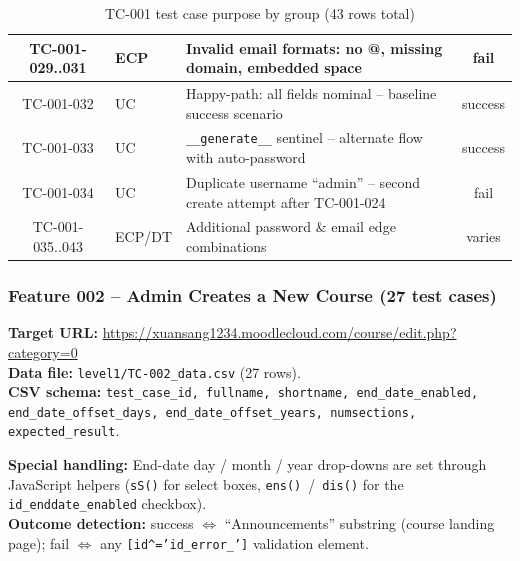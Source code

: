 \documentclass[twoside,final]{hcmut-report}
\begin{document}
\begin{table}[H]
\begin{tabularx}{\textwidth}{|c|l|X|c|}
TC-001-029..031 & ECP & Invalid email formats: no @, missing domain, embedded space & fail \\ \hline
TC-001-032 & UC & Happy-path: all fields nominal -- baseline success scenario & success \\ \hline
TC-001-033 & UC & \texttt{\_\_generate\_\_} sentinel -- alternate flow with auto-password & success \\ \hline
TC-001-034 & UC & Duplicate username ``admin'' -- second create attempt after TC-001-024 & fail \\ \hline
TC-001-035..043 & ECP/DT & Additional password \& email edge combinations & varies \\ \hline
\end{tabularx}
\caption{TC-001 test case purpose by group (43 rows total)}
\end{table}

\subsubsection{Feature 002 -- Admin Creates a New Course (27 test cases)}

\textbf{Target URL:} \url{https://xuansang1234.moodlecloud.com/course/edit.php?category=0}\\
\textbf{Data file:} \texttt{level1/TC-002\_data.csv} (27 rows).\\
\textbf{CSV schema:} \texttt{test\_case\_id, fullname, shortname, end\_date\_enabled, end\_date\_offset\_days, end\_date\_offset\_years, numsections, expected\_result}.

\textbf{Special handling:} End-date day / month / year drop-downs are set through JavaScript helpers (\texttt{sS()} for select boxes, \texttt{ens()}~/~\texttt{dis()} for the \texttt{id\_enddate\_enabled} checkbox).\\
\textbf{Outcome detection:} success $\Leftrightarrow$ ``Announcements'' substring (course landing page); fail $\Leftrightarrow$ any \texttt{[id\^{}='id\_error\_']} validation element.
\end{document}
